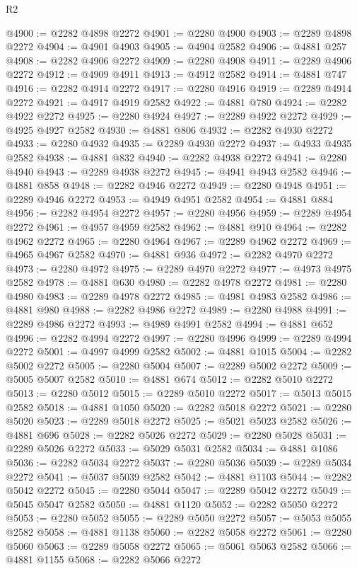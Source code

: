 \begin{lexlean}{R2}
\begin{coremodule}
@4900 := @2282 @4898 @2272
@4901 := @2280 @4900
@4903 := @2289 @4898 @2272
@4904 := @4901 @4903
@4905 := @4904 @2582
@4906 := @4881 @257
@4908 := @2282 @4906 @2272
@4909 := @2280 @4908
@4911 := @2289 @4906 @2272
@4912 := @4909 @4911
@4913 := @4912 @2582
@4914 := @4881 @747
@4916 := @2282 @4914 @2272
@4917 := @2280 @4916
@4919 := @2289 @4914 @2272
@4921 := @4917 @4919 @2582
@4922 := @4881 @780
@4924 := @2282 @4922 @2272
@4925 := @2280 @4924
@4927 := @2289 @4922 @2272
@4929 := @4925 @4927 @2582
@4930 := @4881 @806
@4932 := @2282 @4930 @2272
@4933 := @2280 @4932
@4935 := @2289 @4930 @2272
@4937 := @4933 @4935 @2582
@4938 := @4881 @832
@4940 := @2282 @4938 @2272
@4941 := @2280 @4940
@4943 := @2289 @4938 @2272
@4945 := @4941 @4943 @2582
@4946 := @4881 @858
@4948 := @2282 @4946 @2272
@4949 := @2280 @4948
@4951 := @2289 @4946 @2272
@4953 := @4949 @4951 @2582
@4954 := @4881 @884
@4956 := @2282 @4954 @2272
@4957 := @2280 @4956
@4959 := @2289 @4954 @2272
@4961 := @4957 @4959 @2582
@4962 := @4881 @910
@4964 := @2282 @4962 @2272
@4965 := @2280 @4964
@4967 := @2289 @4962 @2272
@4969 := @4965 @4967 @2582
@4970 := @4881 @936
@4972 := @2282 @4970 @2272
@4973 := @2280 @4972
@4975 := @2289 @4970 @2272
@4977 := @4973 @4975 @2582
@4978 := @4881 @630
@4980 := @2282 @4978 @2272
@4981 := @2280 @4980
@4983 := @2289 @4978 @2272
@4985 := @4981 @4983 @2582
@4986 := @4881 @980
@4988 := @2282 @4986 @2272
@4989 := @2280 @4988
@4991 := @2289 @4986 @2272
@4993 := @4989 @4991 @2582
@4994 := @4881 @652
@4996 := @2282 @4994 @2272
@4997 := @2280 @4996
@4999 := @2289 @4994 @2272
@5001 := @4997 @4999 @2582
@5002 := @4881 @1015
@5004 := @2282 @5002 @2272
@5005 := @2280 @5004
@5007 := @2289 @5002 @2272
@5009 := @5005 @5007 @2582
@5010 := @4881 @674
@5012 := @2282 @5010 @2272
@5013 := @2280 @5012
@5015 := @2289 @5010 @2272
@5017 := @5013 @5015 @2582
@5018 := @4881 @1050
@5020 := @2282 @5018 @2272
@5021 := @2280 @5020
@5023 := @2289 @5018 @2272
@5025 := @5021 @5023 @2582
@5026 := @4881 @696
@5028 := @2282 @5026 @2272
@5029 := @2280 @5028
@5031 := @2289 @5026 @2272
@5033 := @5029 @5031 @2582
@5034 := @4881 @1086
@5036 := @2282 @5034 @2272
@5037 := @2280 @5036
@5039 := @2289 @5034 @2272
@5041 := @5037 @5039 @2582
@5042 := @4881 @1103
@5044 := @2282 @5042 @2272
@5045 := @2280 @5044
@5047 := @2289 @5042 @2272
@5049 := @5045 @5047 @2582
@5050 := @4881 @1120
@5052 := @2282 @5050 @2272
@5053 := @2280 @5052
@5055 := @2289 @5050 @2272
@5057 := @5053 @5055 @2582
@5058 := @4881 @1138
@5060 := @2282 @5058 @2272
@5061 := @2280 @5060
@5063 := @2289 @5058 @2272
@5065 := @5061 @5063 @2582
@5066 := @4881 @1155
@5068 := @2282 @5066 @2272

\end{coremodule}
\end{lexlean}
